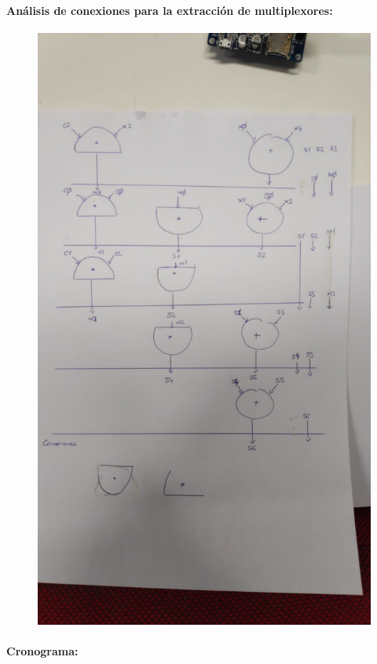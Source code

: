 \documentclass{article}
\begin{document}
\paragraph{Análisis de conexiones para la extracción de multiplexores:}



\begin{figure}[H]
\centering
\includegraphics[width=0.7\linewidth]{images/2_2_2.png}
\end{figure}

\newpage

\paragraph{Cronograma:}
\end{document}
